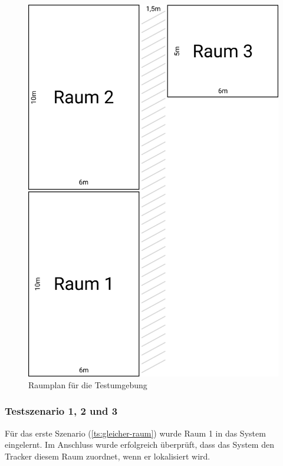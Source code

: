 \begin{figure}[htbp]
	\centering
	\includegraphics[height=.6\textheight]{images/floor-plan.png}
	\caption{Raumplan für die Testumgebung}
	\label{fig:floorplan}
\end{figure}

\FloatBarrier

\subsubsection{Testszenario 1, 2 und 3}

Für das erste Szenario (\ref{ts:gleicher-raum}) wurde Raum 1 in das System eingelernt. Im Anschluss
wurde erfolgreich überprüft, dass das System den Tracker diesem Raum zuordnet, wenn er lokalisiert
wird.

